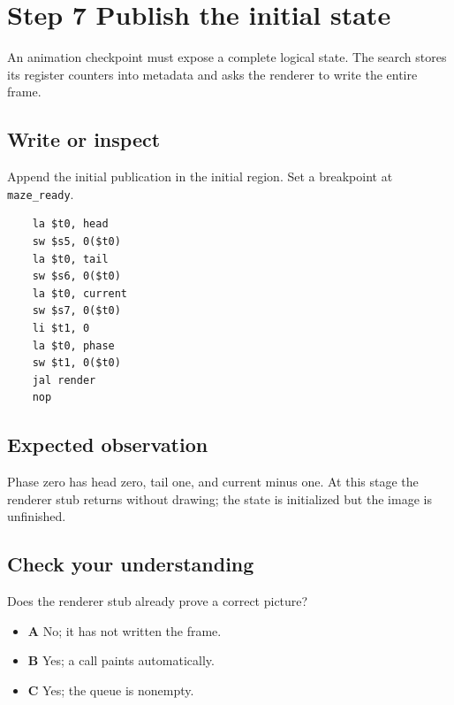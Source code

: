 \section{Step 7 Publish the initial state}\label{maze-s07}

An animation checkpoint must expose a complete logical state. The search stores its register counters into metadata and asks the renderer to write the entire frame.

\subsection{Write or inspect}

Append the initial publication in the initial region. Set a breakpoint at \texttt{maze\_ready}.

\begin{verbatim}
    la $t0, head
    sw $s5, 0($t0)
    la $t0, tail
    sw $s6, 0($t0)
    la $t0, current
    sw $s7, 0($t0)
    li $t1, 0
    la $t0, phase
    sw $t1, 0($t0)
    jal render
    nop
\end{verbatim}

\subsection{Expected observation}

Phase zero has head zero, tail one, and current minus one. At this stage the renderer stub returns without drawing; the state is initialized but the image is unfinished.

\subsection{Check your understanding}

Does the renderer stub already prove a correct picture?

\begin{itemize}
  \item \textbf{A} No; it has not written the frame.
  \item \textbf{B} Yes; a call paints automatically.
  \item \textbf{C} Yes; the queue is nonempty.
\end{itemize}
